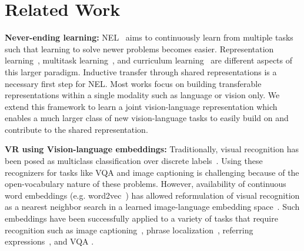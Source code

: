 \section{Related Work}
\label{sec:related}
\noindent \textbf{Never-ending learning:}  NEL~\cite{mitchell2010never,carlson2010toward,thrun1998lifelong,silver2013lifelong,chen2013iccv} aims to continuously learn from multiple tasks such that learning to solve newer problems becomes easier. Representation learning~\cite{bengio2013pami}, multitask learning~\cite{caruana1998springer}, and curriculum learning~\cite{pentina2015curriculum} are different aspects of this larger paradigm. Inductive transfer through shared representations is a necessary first step for NEL. Most works focus on building transferable representations within a single modality such as language or vision only. We extend this framework to learn a joint vision-language representation which enables a much larger class of new vision-language tasks to easily build on and contribute to the shared representation. \\
\vspace{-2mm}

\noindent \textbf{VR using Vision-language embeddings:} Traditionally, visual recognition has been posed as multiclass classification over discrete labels~\cite{he2015deep,simonyan2014very,krizhevsky2012imagenet}. Using these recognizers for tasks like VQA and image captioning is challenging because of the open-vocabulary nature of these problems. However, availability of continuous word embeddings (e.g. word2vec~\cite{mikolov2013efficient}) has allowed reformulation of visual recognition as a nearest neighbor search in a learned image-language embedding space~\cite{wang2016learning}. Such embeddings have been successfully applied to a variety of tasks that require recognition such as image captioning~\cite{lin2014microsoft,hodosh2013framing}, phrase localization~\cite{plummer2015flickr30k,krishna2016visual}, referring 
expressions~\cite{KazemzadehOrdonezMattenBergEMNLP14,Mao2016cvpr}, and VQA \cite{antol2015vqa,ren2015nips,yu2015visual}. 

